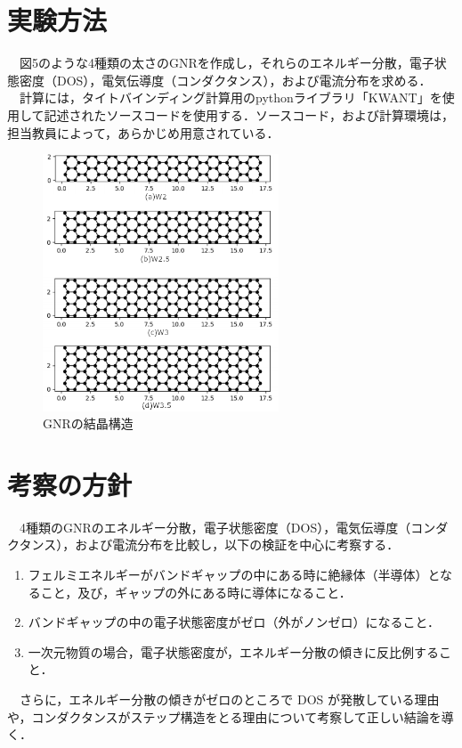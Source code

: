 \section{実験方法}
　図5のような4種類の太さのGNRを作成し，それらのエネルギー分散，電子状態密度（DOS），電気伝導度（コンダクタンス），および電流分布を求める．\\
　計算には，タイトバインディング計算用のpythonライブラリ「KWANT」を使用して記述されたソースコードを使用する．ソースコード，および計算環境は，担当教員によって，あらかじめ用意されている．
\begin{figure}[H]
  \centering
  \includegraphics[width=7cm]{./imgs/5.png}
  \caption{GNRの結晶構造}
\end{figure}

\section{考察の方針}
　4種類のGNRのエネルギー分散，電子状態密度（DOS），電気伝導度（コンダクタンス），および電流分布を比較し，以下の検証を中心に考察する．
\begin{enumerate}
  \item フェルミエネルギーがバンドギャップの中にある時に絶縁体（半導体）となること，及び，ギャップの外にある時に導体になること．
  \item バンドギャップの中の電子状態密度がゼロ（外がノンゼロ）になること．
  \item 一次元物質の場合，電子状態密度が，エネルギー分散の傾きに反比例すること．
\end{enumerate}

　さらに，エネルギー分散の傾きがゼロのところで DOS が発散している理由や，コンダクタンスがステップ構造をとる理由について考察して正しい結論を導く．


\newpage

